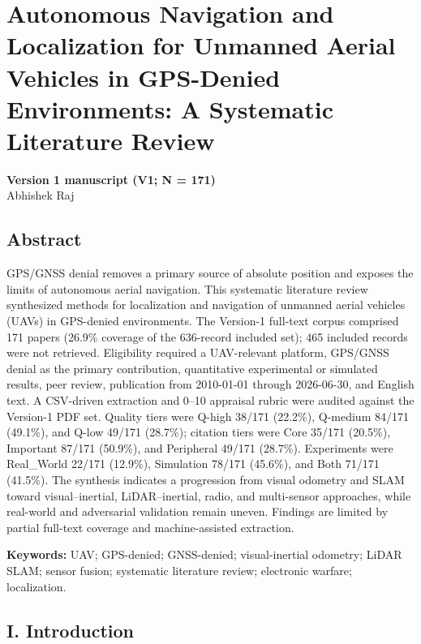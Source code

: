 \documentclass[
  journal,
  10pt]{IEEEtran}
\author{}
\date{}
\begin{document}
\section{Autonomous Navigation and Localization for Unmanned Aerial
Vehicles in GPS-Denied Environments: A Systematic Literature
Review}\label{autonomous-navigation-and-localization-for-unmanned-aerial-vehicles-in-gps-denied-environments-a-systematic-literature-review}

\textbf{Version 1 manuscript (V1; N = 171)}\\
Abhishek Raj

\subsection{Abstract}\label{abstract}

GPS/GNSS denial removes a primary source of absolute position and
exposes the limits of autonomous aerial navigation. This systematic
literature review synthesized methods for localization and navigation of
unmanned aerial vehicles (UAVs) in GPS-denied environments. The
Version-1 full-text corpus comprised 171 papers (26.9\% coverage of the
636-record included set); 465 included records were not retrieved.
Eligibility required a UAV-relevant platform, GPS/GNSS denial as the
primary contribution, quantitative experimental or simulated results,
peer review, publication from 2010-01-01 through 2026-06-30, and English
text. A CSV-driven extraction and 0--10 appraisal rubric were audited
against the Version-1 PDF set. Quality tiers were Q-high 38/171
(22.2\%), Q-medium 84/171 (49.1\%), and Q-low 49/171 (28.7\%); citation
tiers were Core 35/171 (20.5\%), Important 87/171 (50.9\%), and
Peripheral 49/171 (28.7\%). Experiments were Real\_World 22/171
(12.9\%), Simulation 78/171 (45.6\%), and Both 71/171 (41.5\%). The
synthesis indicates a progression from visual odometry and SLAM toward
visual--inertial, LiDAR--inertial, radio, and multi-sensor approaches,
while real-world and adversarial validation remain uneven. Findings are
limited by partial full-text coverage and machine-assisted extraction.

\textbf{Keywords:} UAV; GPS-denied; GNSS-denied; visual-inertial
odometry; LiDAR SLAM; sensor fusion; systematic literature review;
electronic warfare; localization.

\subsection{I. Introduction}\label{i-introduction}
\end{document}
